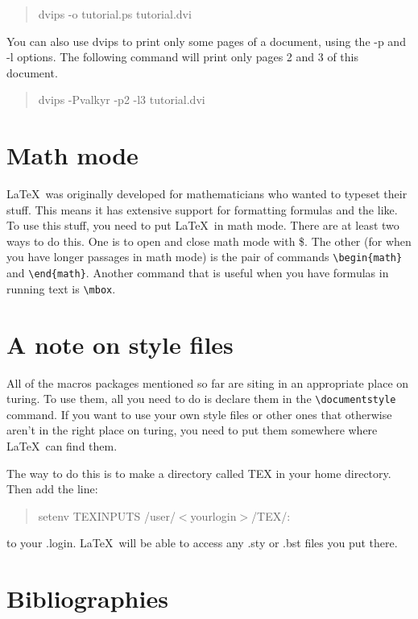 \begin{quote}
dvips -o tutorial.ps tutorial.dvi
\end{quote}

\noindent
You can also use dvips to print only some pages of a document,
using the -p and -l options.  The following command will print
only pages 2 and 3 of this document.

\begin{quote}
dvips -Pvalkyr -p2 -l3 tutorial.dvi
\end{quote}

\section{Math mode}

\LaTeX\ was originally developed for mathematicians who wanted
to typeset their stuff.  This means it has extensive support for
formatting formulas and the like.  To use this stuff, you need to
put \LaTeX\ in math mode.  There are at least two ways to do this.  One
is to open and close math mode with \$.  The other (for when you
have longer passages in math mode) is the pair of commands
\verb+\begin{math}+ and \verb+\end{math}+.  Another command that
is useful when you have formulas in running text is \verb+\mbox+.

\section{A note on style files}

All of the macros packages mentioned so far are siting in an appropriate
place on turing.  To use them, all you need to do is declare them 
in the \verb+\documentstyle+ command.  If you want to use your own
style files or other ones that otherwise aren't in the right place on
turing, you need to put them somewhere where \LaTeX\ can find them.

The way to do this is to make a directory called TEX in your home
directory.  Then add the line:

\begin{quote}
setenv TEXINPUTS /user/$<$yourlogin$>$/TEX/:
\end{quote}

\noindent
to your .login.  \LaTeX\ will be able to access any .sty or .bst
files you put there.

\section{Bibliographies}

